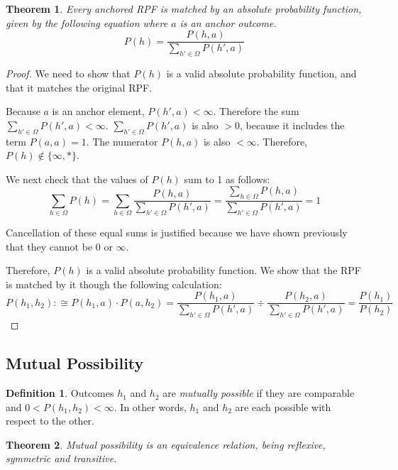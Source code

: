 \documentclass[twoside]{article}
\theoremstyle{plain}%
\newtheorem{theorem}{Theorem}[section]
\theoremstyle{definition}
\newtheorem{definition}{Definition}[section]
\theoremstyle{remark}
\begin{document}
\begin{theorem}
\label{thm:absolute_prob_formula}
Every anchored RPF is matched by an absolute probability function, given by the following equation where \(a\) is an anchor outcome.
\[P(h) = \frac{P(h, a)}{\sum_{h' \in \Omega}P(h', a)}\]
\end{theorem}

\begin{proof}
We need to show that \(P(h)\) is a valid absolute probability function, and that it matches the original RPF.

Because \(a\) is an anchor element, \(P(h', a) < \infty\). Therefore the sum \(\sum_{h' \in \Omega}P(h', a) < \infty\). \(\sum_{h' \in \Omega}P(h', a)\) is also \(>0\), because it includes the term \(P(a, a) = 1\). The numerator \(P(h, a)\) is also \(< \infty\). Therefore, \(P(h) \notin \{\infty, \ast\}\).

We next check that the values of \(P(h)\) sum to 1 as follows:
\[\sum_{h \in \Omega}P(h) = \sum_{h \in \Omega} \frac{P(h, a)}{\sum_{h' \in \Omega}P(h', a)} = \frac{\sum_{h \in \Omega}P(h, a)}{\sum_{h' \in \Omega}P(h', a)} = 1\]

Cancellation of these equal sums is justified because we have shown previously that they cannot be \(0\) or \(\infty\).

Therefore, \(P(h)\) is a valid absolute probability function. We show that the RPF is matched by it though the following calculation:
\begin{equation}
P(h_1, h_2) :\cong P(h_1, a) \cdot P(a, h_2) = \frac{P(h_1, a)}{\sum_{h' \in \Omega}P(h', a)} \div \frac{P(h_2, a)}{\sum_{h' \in \Omega}P(h', a)} = \frac{P(h_1)}{P(h_2)}
\end{equation}
\end{proof}

\subsection{Mutual Possibility}

\begin{definition}
Outcomes \(h_1\) and \(h_2\) are \textit{mutually possible} if they are comparable and \(0 < P(h_1, h_2) < \infty\). In other words, \(h_1\) and \(h_2\) are each possible with respect to the other.
\end{definition}

\begin{theorem}
Mutual possibility is an \textit{equivalence relation}, being reflexive, symmetric and transitive.
\end{theorem}
\end{document}
